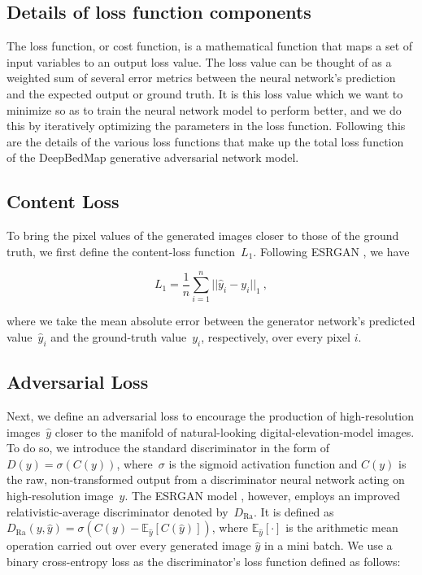 \begin{appendices}

\section{Details of loss function components} \label{appendix:A}

The loss function, or cost function, is a mathematical function that maps a set of input variables to an output loss value.
The loss value can be thought of as a weighted sum of several error metrics between the neural network's prediction and the expected output or ground truth.
It is this loss value which we want to minimize so as to train the neural network model to perform better, and we do this by iteratively optimizing the parameters in the loss function.
Following this are the details of the various loss functions that make up the total loss function of the DeepBedMap generative adversarial network model.

\subsection{Content Loss}

To bring the pixel values of the generated images closer to those of the ground truth, we first define the content-loss function~$L_1$.
Following ESRGAN \citep{WangESRGANEnhancedSuperResolution2019}, we have

\begin{equation}\label{eq:A1}
  L_1 = \dfrac{1}{n} \sum\limits_{i=1}^n ||\hat{y}_i - y_i||_{1}~,
\end{equation}

where we take the mean absolute error between the generator network's predicted value~$\hat{y}_i$ and the ground-truth value~$y_i$, respectively, over every pixel $i$.

\subsection{Adversarial Loss}

Next, we define an adversarial loss to encourage the production of high-resolution images~$\hat{y}$ closer to the manifold of natural-looking digital-elevation-model images.
To do so, we introduce the standard discriminator in the form of $D(y) = \sigma(C(y))$, where~$\sigma$ is the sigmoid activation function and $C(y)$ is the raw, non-transformed output from a discriminator neural network acting on high-resolution image~$y$.
The ESRGAN model \citep{WangESRGANEnhancedSuperResolution2019}, however, employs an improved relativistic-average discriminator \citep{Jolicoeur-Martineaurelativisticdiscriminatorkey2018} denoted by~$D_{\text{Ra}}$.
It is defined as $D_{\text{Ra}}(y,\hat{y}) = \sigma(C(y) - \mathbb{E}_{\hat{y}}[C(\hat{y})])$, where $\mathbb{E}_{\hat{y}}[\cdot]$ is the arithmetic mean operation carried out over every generated image $\hat{y}$ in a mini batch.
We use a binary cross-entropy loss as the discriminator's loss function defined as follows:


\end{appendices}
